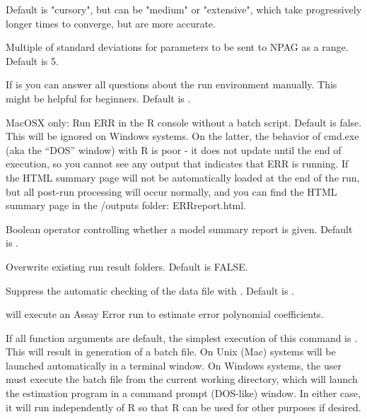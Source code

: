 \documentclass[a4paper]{book}
\begin{document}
\begin{Arguments}
\begin{ldescription}
\item[\code{search}] Default is "cursory", but can be "medium" or "extensive", which take progressively
longer times to converge, but are more accurate.

\item[\code{xdev}] Multiple of standard deviations for parameters to be sent to NPAG as a range.  Default is 5.

\item[\code{auto}] If  is  you can answer all questions about the run environment manually.  This might
be helpful for beginners.  Default is .

\item[\code{intern}] MacOSX only: Run ERR in the R console without a batch script.  Default is false.
This will be ignored on Windows systems.  On the latter, the behavior of cmd.exe (aka the ``DOS'' window)
with R is poor - it does not update until the end of execution, so you cannot see any output that indicates that ERR is running.  
If  the HTML summary page will not be automatically loaded at the end of the run, but all post-run processing will occur normally,
and you can find the HTML summary page in the /outputs folder: ERRreport.html.

\item[\code{silent}] Boolean operator controlling whether a model summary report is given.  Default is .

\item[\code{overwrite}] Overwrite existing run result folders.  Default is FALSE.

\item[\code{nocheck}] Suppress the automatic checking of the data file with .  Default is .
\end{ldescription}
\end{Arguments}
%
\begin{Details}\relax
{} will execute an Assay Error run to estimate error polynomial coefficients.

If all function arguments are default, the simplest execution of this command is 
.  This will result in generation of a batch file.  On Unix (Mac) systems
will be launched automatically in a terminal window.  On Windows systems, the user
must execute the batch file from the current working directory, which will launch the estimation
program in a command prompt (DOS-like) window.  In either case, it will run independently of R
so that R can be used for other purposes if desired.
\end{Details}
\end{document}
